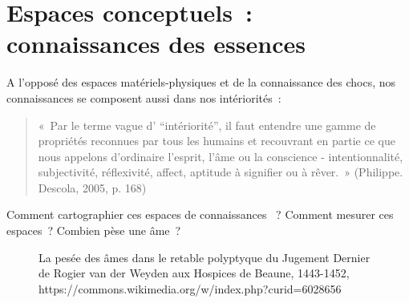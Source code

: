 \documentclass[
  a4paper,
  DIV=11,
  numbers=noendperiod]{scrreprt}
\begin{document}
\section{Espaces conceptuels~: connaissances des
essences}\label{sec-espaceConceptuels}

A l'opposé des espaces matériels-physiques et de la connaissance des
chocs, nos connaissances se composent aussi dans nos intériorités~:

\begin{quote}
«~Par le terme vague d' ``intériorité'', il faut entendre une gamme de
propriétés reconnues par tous les humains et recouvrant en partie ce que
nous appelons d'ordinaire l'esprit, l'âme ou la conscience -
intentionnalité, subjectivité, réflexivité, affect, aptitude à signifier
ou à rêver.~» (Philippe. Descola, 2005, p. 168)
\end{quote}

Comment cartographier ces espaces de connaissances ~? Comment mesurer
ces espaces~? Combien pèse une âme~?

\begin{figure}


\caption{\label{fig-peseeAme}La pesée des âmes dans le retable
polyptyque du Jugement Dernier de Rogier van der Weyden aux Hospices de
Beaune, 1443-1452,
https://commons.wikimedia.org/w/index.php?curid=6028656}

\end{figure}%
\end{document}
